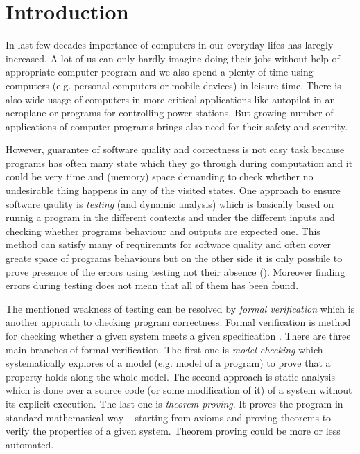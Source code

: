 \chapter{Introduction}
In last few decades importance of computers in our everyday lifes has laregly increased.
A lot of us can only hardly imagine doing their jobs without help of appropriate computer program
and we also spend a plenty of time using computers (e.g. personal computers or mobile devices) in leisure time.
There is also wide usage of computers in more critical applications like autopilot in an aeroplane
or programs for controlling power stations.
But growing number of applications of computer programs brings also need for their safety and security.

However, guarantee of software quality and correctness is not easy task
because programs has often many state which they go through during computation
and it could be very time and (memory) space demanding to check whether no undesirable thing
happens in any of the visited states.
One approach to ensure software qaulity is \emph{testing} (and dynamic analysis) which is basically based
on runnig a program in the different contexts and under the different inputs
and checking whether programs behaviour and outputs are expected one.
This method can satisfy many of requiremnts for software quality and often cover greate space of programs behaviours
but on the other side it is only possbile to prove presence of the errors using testing not their absence (\cite{djikstra}).
Moreover finding errors during testing does not mean that all of them has been found.

The mentioned weakness of testing can be resolved by \emph{formal verification}
which is another approach to checking program correctness.
Formal verification is method for checking whether a given system meets a given specification \cite{fav:lecture}.
There are three main branches of formal verification.
The first one is \emph{model checking} which systematically explores of a model (e.g. model of a program) to
prove that a property holds along the whole model.
The second approach is static analysis which is done over a source code (or some modification of it) of a system
without its explicit execution.
The last one is \emph{theorem proving}.
It proves the program in standard mathematical way -- starting from axioms and proving theorems to
verify the properties of a given system.
Theorem proving could be more or less automated.

